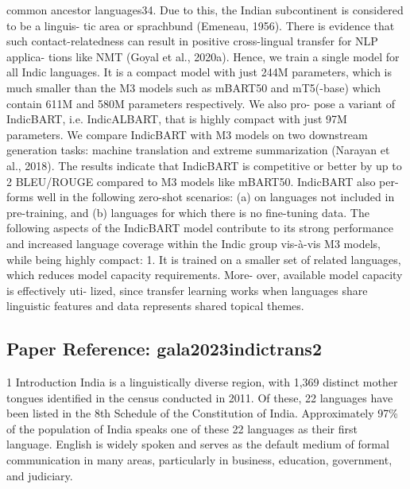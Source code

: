 \documentclass[11pt,a4paper]{article}
\begin{document}
common ancestor languages34. Due to this, the Indian subcontinent is considered to be a linguis- tic area or sprachbund (Emeneau, 1956). There is evidence that such contact-relatedness can result in positive cross-lingual transfer for NLP applica- tions like NMT (Goyal et al., 2020a). Hence, we train a single model for all Indic languages. It is a compact model with just 244M parameters, which is much smaller than the M3 models such as mBART50 and mT5(-base) which contain 611M and 580M parameters respectively. We also pro- pose a variant of IndicBART, i.e. IndicALBART, that is highly compact with just 97M parameters. We compare IndicBART with M3 models on two downstream generation tasks: machine translation and extreme summarization (Narayan et al., 2018). The results indicate that IndicBART is competitive or better by up to 2 BLEU/ROUGE compared to M3 models like mBART50. IndicBART also per- forms well in the following zero-shot scenarios: (a) on languages not included in pre-training, and (b) languages for which there is no ﬁne-tuning data. The following aspects of the IndicBART model contribute to its strong performance and increased language coverage within the Indic group vis-à-vis M3 models, while being highly compact: 1. It is trained on a smaller set of related languages, which reduces model capacity requirements. More- over, available model capacity is effectively uti- lized, since transfer learning works when languages share linguistic features and data represents shared topical themes.

\vspace{18pt}


\subsection*{Paper Reference: gala2023indictrans2}

1 Introduction India is a linguistically diverse region, with 1,369 distinct mother tongues identified in the census conducted in 2011. Of these, 22 languages have been listed in the 8th Schedule of the Constitution of India. Approximately 97\% of the population of India speaks one of these 22 languages as their first language. English is widely spoken and serves as the default medium of formal communication in many areas, particularly in business, education, government, and judiciary.
\end{document}
